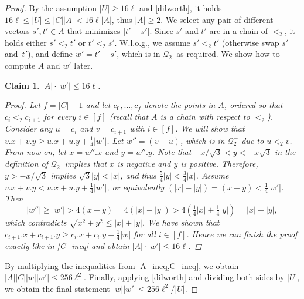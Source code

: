 \documentclass[a4paper,11pt]{article}
\let\Cref\cref
\newtheorem{claim}{Claim}[section]
\newcommand{\Q}{\mathcal{Q}}
\newcommand{\absolute}[1]{\left\lvert#1\right\rvert}
\begin{document}
\begin{proof}
By the assumption $\absolute{U} \ge 16\ell$ and \Cref{dilworth}, it holds
$16 \ell \le \absolute{U} \le \absolute{C} \absolute{A} < 16\ell\absolute{A}$,
thus $\absolute{A} \ge 2$.
We select any pair of different vectors $s', t' \in A$ that minimizes $\absolute{t' - s'}$. Since $s'$ and $t'$ are in a chain of $<_2$, it holds either $s' <_2 t'$ or $t' <_2 s'$. W.l.o.g., we assume $s' <_2 t'$ (otherwise swap $s'$ and~$t'$), and define $w' = t' - s'$, which is in $\Q_2^-$ as required.  We show how to compute $A$ and $w'$ later.

\begin{claim}\label{A_ineq}
	$\absolute{A}\cdot \absolute{w'} \leq 16\ell$. 
	\begin{proof}
	
		Let $f = \absolute{C} - 1$ and
		let $c_0, \dots, c_{f}$ denote the points in $A$, ordered so that $c_i <_2 c_{i + 1}$ for every $i \in [f]$ (recall that $A$ is a chain with respect to $<_2$).
		Consider any $u = c_i$ and $v = c_{i + 1}$ with $i \in [f]$. We will show that $v.x + v.y \geq u.x + u.y + \frac14\absolute{w'}$. 		
		Let $w'' = (v - u)$, which is in $\Q_2^-$ due to $u <_2 v$. From now on, let $x = w''.x$ and $y = w''.y$. 
		Note that $-x/\sqrt{3} < y < -x \sqrt{3}$ in the definition of $\Q_2^-$ implies that $x$ is negative and $y$ is positive.
		Therefore, $y > -x/\sqrt{3}$ implies $\sqrt{3}\absolute{y} < \absolute{x}$, and thus $\frac 5 4\absolute{y} < \frac 3 4\absolute{x}$.
		Assume $v.x + v.y < u.x + u.y + \frac14\absolute{w'}$, or equivalently $(\absolute{x} - \absolute{y}) = (x + y) < \frac14\absolute{w'}$. Then $$\absolute{w''} \geq \absolute{w'} > 4(x + y) = 4(\absolute{x} - \absolute{y}) > 4(\tfrac14\absolute{x} + \tfrac14\absolute{y}) = 
		\absolute{x} + \absolute{y},$$
		which contradicts $\sqrt{x^2 + y^2} \leq \absolute{x} + \absolute{y}$. We have shown that $c_{i + 1}.x + c_{i + 1}.y \geq c_i.x + c_i.y + \frac14\absolute{w}$ for all $i \in [f]$. Hence we can finish the proof exactly like in \cref{C_ineq} and obtain $\absolute{A}\cdot \absolute{w'} \leq 16\ell$.
	\end{proof}
\end{claim}

By multiplying the inequalities from \cref{A_ineq,C_ineq}, we obtain $\absolute{A}\absolute{C}\absolute{w}\absolute{w'} \leq 256\ell^2$. Finally, applying \cref{dilworth} and dividing both sides by $\absolute{U}$, we obtain the final statement $\absolute{w}\absolute{w'} \leq 256\ell^2/\absolute{U}$.


\end{proof}
\end{document}
